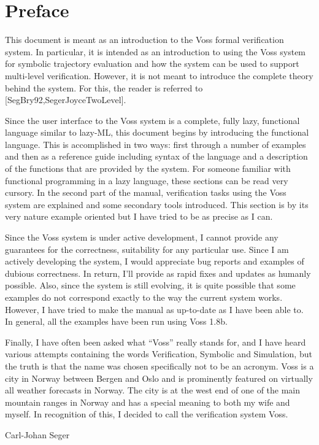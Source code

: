 \section*{Preface}

This document is meant as an introduction to the Voss formal
verification system.
In particular, it is intended as an introduction
to using the Voss system for symbolic trajectory evaluation
and how the system can be used to support multi-level verification.
However, it is not meant to introduce the complete theory behind the system.
For this, the reader is referred to [SegBry92,SegerJoyceTwoLevel].

Since the user interface to the Voss system is a complete, fully
lazy, functional language similar to lazy-ML, this document begins
by introducing the functional language.
This is accomplished in two ways: first through a number of examples
and then as a reference guide including syntax of the language and
a description of the functions that are provided by the system. 
For someone familiar with functional programming in a
lazy language, these sections can be read very cursory.
In the second part of the manual, verification tasks using the Voss system
are explained and some secondary tools introduced.
This section is by its very nature example oriented but I have tried
to be as precise as I can.

Since the Voss system is under active development, I cannot provide any
guarantees for the correctness, suitability for any particular use.
Since I am actively developing the system, I would appreciate bug reports
and examples of dubious correctness.
In return, I'll provide as rapid fixes and updates as humanly possible.
Also, since the system is still evolving, it is quite
possible that some examples do not correspond exactly to the way
the current system works.
However, I have tried to make the manual as up-to-date as I have been able to.
In general, all the examples have been run using Voss 1.8b.

Finally, I have often been asked
what ``Voss'' really  stands for, and I have heard various attempts
containing the words Verification, Symbolic and Simulation, but
the truth is that the name was chosen specifically not to be an acronym.
Voss%
%
{} is a city in Norway between Bergen and Oslo and is
prominently featured on virtually all weather forecasts in Norway.
The city is at the west end of one of the main mountain ranges in
Norway and has a special meaning to both my wife and myself.
In recognition of this, I decided to call the verification system Voss.

\hfill Carl-Johan Seger\parbox{1in}{\mbox{ }}

